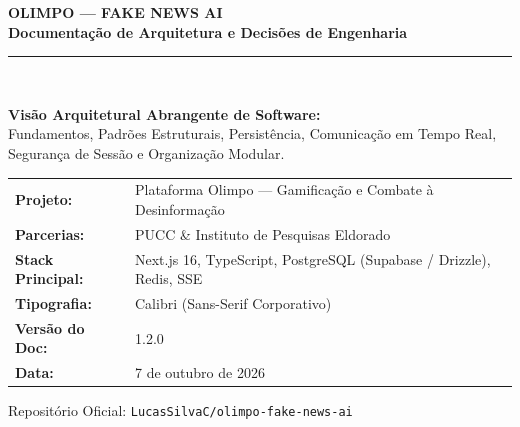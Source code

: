 \documentclass[12pt,a4paper]{article}
\begin{document}
\begin{titlepage}
  \centering
  \vspace*{1.5cm}
  
  {\Huge \textbf{\color{primary}OLIMPO — FAKE NEWS AI}}\\[0.4cm]
  {\Large \textbf{\color{secondary}Documentação de Arquitetura e Decisões de Engenharia}}\\[0.8cm]
  \rule{\textwidth}{1.5pt}\\[1.5cm]

  \begin{minipage}{0.9\textwidth}
    \centering
    \textbf{Visão Arquitetural Abrangente de Software:}\\
    Fundamentos, Padrões Estruturais, Persistência, Comunicação em Tempo Real, 
    Segurança de Sessão e Organização Modular.
  \end{minipage}

  \vfill

  \begin{minipage}{0.85\textwidth}
    \begin{tabular}{ll}
      \textbf{Projeto:} & Plataforma Olimpo — Gamificação e Combate à Desinformação \\
      \textbf{Parcerias:} & PUCC \& Instituto de Pesquisas Eldorado \\
      \textbf{Stack Principal:} & Next.js 16, TypeScript, PostgreSQL (Supabase / Drizzle), Redis, SSE \\
      \textbf{Tipografia:} & Calibri (Sans-Serif Corporativo) \\
      \textbf{Versão do Doc:} & 1.2.0 \\
      \textbf{Data:} & 7 de outubro de 2026
    \end{tabular}
  \end{minipage}

  \vspace{1.5cm}
  {\small \color{darkslate}Repositório Oficial: \texttt{LucasSilvaC/olimpo-fake-news-ai}}
\end{titlepage}

\newpage
{}
\tableofcontents
\newpage
{}
\end{document}
